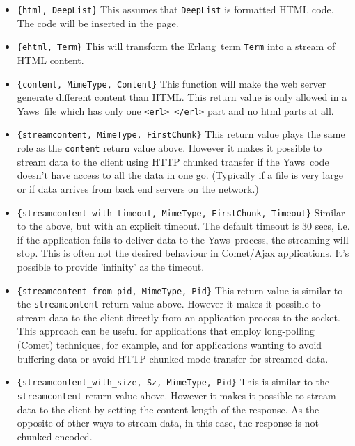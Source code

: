 \documentclass[11pt,oneside,english]{book}
\newcommand{\Erlang}            %
        {{\sc Erlang}}
\newcommand{\Yaws}            %
        {{\sc Yaws}}
\begin{document}
\begin{itemize}


\item \verb+{html, DeepList}+ This assumes that \verb+DeepList+ is
  formatted HTML code.  The code will be inserted in the page.

\item \verb+{ehtml, Term}+ This will transform the \Erlang\ term
  \verb+Term+ into a stream of HTML content.

\item \verb+{content, MimeType, Content}+ This function will make the
  web server generate different content than HTML. This return value
  is only allowed in a \Yaws\ file which has only one
  \verb+<erl> </erl>+ part and no html parts at all.

\item \verb+{streamcontent, MimeType, FirstChunk}+ This return value
  plays the same role as the \verb+content+ return value above.
  However it makes it possible to stream data to the client using HTTP
  chunked transfer if the \Yaws\ code doesn't have access to all the
  data in one go. (Typically if a file is very large or if data
  arrives from back end servers on the network.)

\item
  \verb+{streamcontent_with_timeout, MimeType, FirstChunk, Timeout}+
  Similar to the above, but with an explicit timeout. The default
  timeout is 30 secs, i.e. if the application fails to deliver data to
  the \Yaws\ process, the streaming will stop. This is often not the
  desired behaviour in Comet/Ajax applications. It's possible to
  provide 'infinity' as the timeout.

\item \verb+{streamcontent_from_pid, MimeType, Pid}+ This return value
  is similar to the \verb+streamcontent+ return value above.  However
  it makes it possible to stream data to the client directly from an
  application process to the socket. This approach can be useful for
  applications that employ long-polling (Comet) techniques, for
  example, and for applications wanting to avoid buffering data or
  avoid HTTP chunked mode transfer for streamed data.

\item \verb+{streamcontent_with_size, Sz, MimeType, Pid}+ This is
  similar to the \verb+streamcontent+ return value above. However it
  makes it possible to stream data to the client by setting the
  content length of the response. As the opposite of other ways to
  stream data, in this case, the response is not chunked encoded.



\end{itemize}
\end{document}
